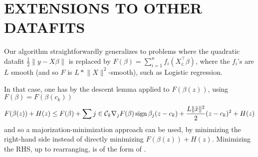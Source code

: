 \section{EXTENSIONS TO OTHER DATAFITS}
\label{sec:other-datafits}

Our algorithm straightforwardly generalizes to problems where the quadratic datafit $\frac{1}{2} \lVert y - X \beta \rVert$ is replaced by $F(\beta) = \sum_{i = 1}^n f_i (X_{i:}^\top \beta)$, where the $f_i$'s are $L$ smooth (and so $F$ is $L * \lVert X \rVert^2$-smooth), such as Logistic regression.

In that case, one has by the descent lemma applied to $F(\beta(z))$, using $F(\beta) = F(\beta(c_k))$
\begin{equation}
  F(\beta(z)) + H(z) \leq F(\beta) + \sum{j \in \mathcal{C}_k} \nabla_j F(\beta) \operatorname{sign} \beta_j (z - c_k) + \frac{L \lVert \tilde x \rVert^2}{2} (z - c_k)^2 + H(z)
\end{equation}
and so a majorization-minimization approach can be used, by minimizing the right-hand side instead of directly minimizing $F(\beta(z)) + H(z)$.
Minimizing the RHS, up to rearranging, is of the form of .
